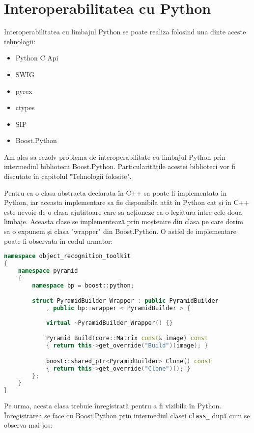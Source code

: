 \section{Interoperabilitatea cu Python}
Interoperabilitatea cu limbajul Python se poate realiza folosind una dinte aceste tehnologii:
\begin{itemize}
	\item Python C Api\cite{pythonCAPI}
	\item SWIG\cite{swig}
	\item pyrex\cite{pyrex}
	\item ctypes\cite{ctypes}
	\item SIP\cite{sip}
	\item Boost.Python\cite{boostpython}
\end{itemize}

Am ales sa rezolv problema de interoperabilitate cu limbajul Python prin intermediul bibliotecii Boost.Python.
Particularitățile acestei biblioteci vor fi discutate în capitolul "Tehnologii folosite".

Pentru ca o clasa abstracta declarata în C++ sa poate fi implementata in Python, iar aceasta implementare sa fie disponibila atât în Python cat și în C++ este nevoie de o clasa ajutătoare care sa acționeze ca o legătura intre cele doua limbaje. 
Aceasta clase se implementează prin moștenire din clasa pe care dorim sa o expunem și clasa "wrapper" din Boost.Python.
O astfel de implementare poate fi observata in codul urmator:
\begin{lstlisting}[language=C++]
namespace object_recognition_toolkit
{
	namespace pyramid
	{
		namespace bp = boost::python;

		struct PyramidBuilder_Wrapper : public PyramidBuilder
			, public bp::wrapper < PyramidBuilder > {
			
			virtual ~PyramidBuilder_Wrapper() {}

			Pyramid Build(core::Matrix const& image) const
			{ return this->get_override("Build")(image); }

			boost::shared_ptr<PyramidBuilder> Clone() const
			{ return this->get_override("Clone")(); }
		};
	}
}
\end{lstlisting}

Pe urma, acesta clasa trebuie înregistrată pentru a fi vizibila în Python.
Înregistrarea se face cu Boost.Python prin intermediul clasei \verb!class_! după cum se observa mai jos:

